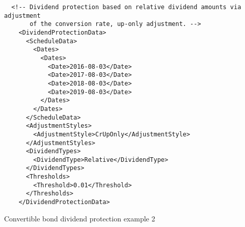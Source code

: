 \begin{listing}[H]
\begin{verbatim}
  <!-- Dividend protection based on relative dividend amounts via adjustment
       of the conversion rate, up-only adjustment. -->
    <DividendProtectionData>
      <ScheduleData>
        <Dates>
          <Dates>
            <Date>2016-08-03</Date>
            <Date>2017-08-03</Date>
            <Date>2018-08-03</Date>
            <Date>2019-08-03</Date>
          </Dates>
        </Dates>
      </ScheduleData>
      <AdjustmentStyles>
        <AdjustmentStyle>CrUpOnly</AdjustmentStyle>
      </AdjustmentStyles>
      <DividendTypes>
        <DividendType>Relative</DividendType>
      </DividendTypes>
      <Thresholds>
        <Threshold>0.01</Threshold>
      </Thresholds>
    </DividendProtectionData>
\end{verbatim}
\caption{Convertible bond dividend protection example 2}
\label{lst:convertiblebonddata_divprot_2}
\end{listing}
